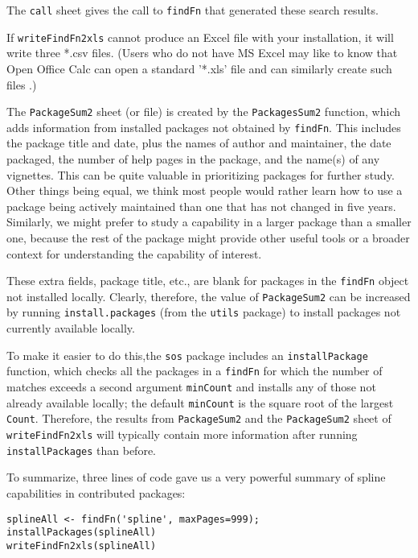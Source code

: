 The {\tt call} sheet gives the call to {\tt findFn}
that generated these search results.

If {\tt writeFindFn2xls} cannot produce an Excel file with 
your installation, it will write three *.csv files.  
(Users who do not have MS Excel may like to know that
Open Office Calc can open a standard '*.xls' file and
can similarly create such files \citep{CALC09MAN}.)

The {\tt PackageSum2} sheet (or file) is created by the
{\tt PackagesSum2} function, which adds information from
installed packages not obtained by
{\tt findFn}.  This includes the package title and date, plus
the names of author and maintainer,
the date packaged, the number of help pages in the package,
and the name(s) of any vignettes.  This can be quite
valuable in prioritizing packages for further study.  
Other things being equal, we think most people would 
rather learn how to use a package being actively maintained
than one that has not changed in five years.  Similarly,
we might prefer to study a capability in a larger package
than a smaller one, because the rest of the package might
provide other useful tools or a broader context for
understanding the capability of interest.

These extra fields, package title, etc., are blank for 
packages in the {\tt findFn} object not installed locally.  
Clearly, therefore, the value of {\tt PackageSum2} can be 
increased by running {\tt install.packages} (from the 
{\tt utils} package) to install packages not currently 
available locally.  

To make it easier to do this,the {\tt sos} package includes 
an {\tt installPackage} function, which checks all the 
packages in a {\tt findFn} for which
the number of matches exceeds a second argument {\tt minCount}
and installs any of those not already available locally;  the
default {\tt minCount} is the square root of the largest
{\tt Count}.  Therefore, the results from {\tt PackageSum2} and the
{\tt PackageSum2} sheet of {\tt writeFindFn2xls} will typically
contain more information after running {\tt installPackages}
than before.

To summarize, three lines of code gave us a very powerful
summary of spline capabilities in contributed \R{}
packages:

\begin{verbatim}
splineAll <- findFn('spline', maxPages=999);
installPackages(splineAll) 
writeFindFn2xls(splineAll)
\end{verbatim}

